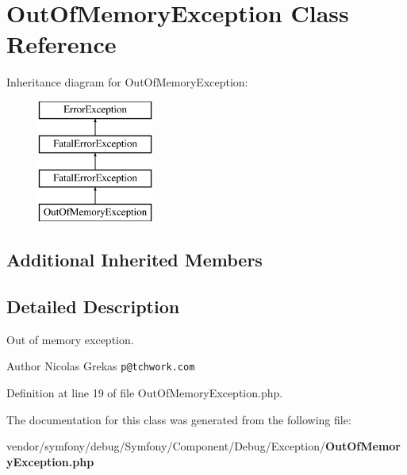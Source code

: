 \section{Out\+Of\+Memory\+Exception Class Reference}
\label{class_symfony_1_1_component_1_1_debug_1_1_exception_1_1_out_of_memory_exception}
Inheritance diagram for Out\+Of\+Memory\+Exception\+:\begin{figure}[H]
\begin{center}
\leavevmode
\includegraphics[height=4.000000cm]{class_symfony_1_1_component_1_1_debug_1_1_exception_1_1_out_of_memory_exception}
\end{center}
\end{figure}
\subsection*{Additional Inherited Members}


\subsection{Detailed Description}
Out of memory exception.

\begin{DoxyAuthor}{Author}
Nicolas Grekas {\tt p@tchwork.\+com} 
\end{DoxyAuthor}


Definition at line 19 of file Out\+Of\+Memory\+Exception.\+php.



The documentation for this class was generated from the following file\+:\begin{DoxyCompactItemize}
\item 
vendor/symfony/debug/\+Symfony/\+Component/\+Debug/\+Exception/{\bf Out\+Of\+Memory\+Exception.\+php}\end{DoxyCompactItemize}
